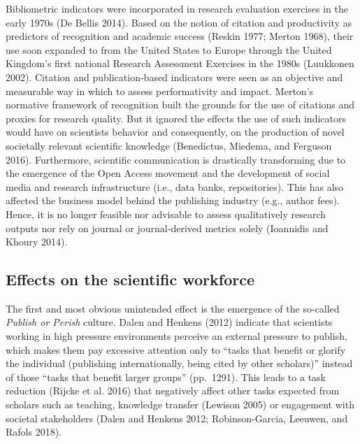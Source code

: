 \documentclass[]{elsarticle} %
\begin{document}
Bibliometric indicators were incorporated in research evaluation
exercises in the early 1970s (De Bellis 2014). Based on the notion of
citation and productivity as predictors of recognition and academic
success (Reskin 1977; Merton 1968), their use soon expanded to from the
United States to Europe through the United Kingdom's first national
Research Assessment Exercises in the 1980s (Luukkonen 2002). Citation
and publication-based indicators were seen as an objective and
measurable way in which to assess performativity and impact. Merton's
normative framework of recognition built the grounds for the use of
citations and proxies for research quality. But it ignored the effects
the use of such indicators would have on scientists behavior and
consequently, on the production of novel societally relevant scientific
knowledge (Benedictus, Miedema, and Ferguson 2016). Furthermore,
scientific communication is drastically transforming due to the
emergence of the Open Access movement and the development of social
media and research infrastructure (i.e., data banks, repositories). This
has also affected the business model behind the publishing industry
(e.g., author fees). Hence, it is no longer feasible nor advisable to
assess qualitatively research outputs nor rely on journal or
journal-derived metrics solely (Ioannidis and Khoury 2014).

\hypertarget{effects-on-the-scientific-workforce}{%
\subsection{Effects on the scientific
workforce}\label{effects-on-the-scientific-workforce}}

The first and most obvious unintended effect is the emergence of the
so-called \emph{Publish or Perish} culture. Dalen and Henkens (2012)
indicate that scientists working in high pressure environments perceive
an external pressure to publish, which makes them pay excessive
attention only to ``tasks that benefit or glorify the individual
(publishing internationally, being cited by other scholars)'' instead of
those ``tasks that benefit larger groups'' (pp.~1291). This leads to a
task reduction (Rijcke et al. 2016) that negatively affect other tasks
expected from scholars such as teaching, knowledge transfer (Lewison
2005) or engagement with societal stakeholders (Dalen and Henkens 2012;
Robinson-Garcia, Leeuwen, and Rafols 2018).
\end{document}
